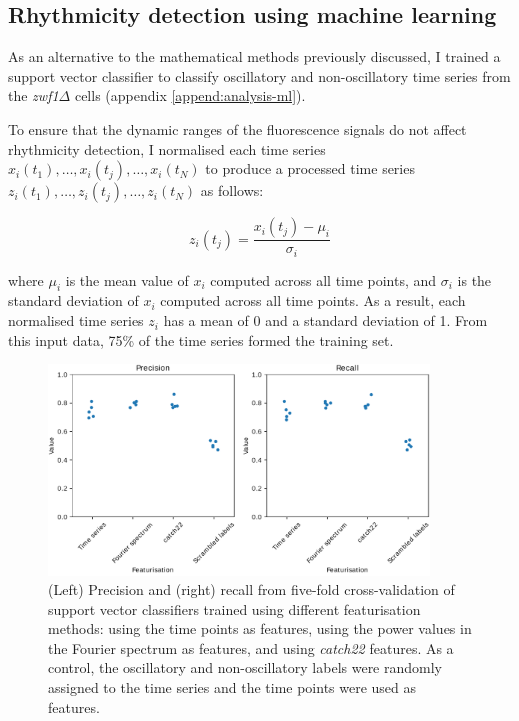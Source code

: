 \subsection{Rhythmicity detection using machine learning}
\label{subsec:analysis-classification-ml}

As an alternative to the mathematical methods previously discussed, I trained a support vector classifier to classify oscillatory and non-oscillatory time series from the \textit{zwf1$\Delta$} cells (appendix \ref{append:analysis-ml}).

To ensure that the dynamic ranges of the fluorescence signals do not affect rhythmicity detection, I normalised each time series $x_{i}(t_{1}), \ldots , x_{i}(t_{j}), \ldots , x_{i}(t_{N})$ to produce a processed time series $z_{i}(t_{1}), \ldots , z_{i}(t_{j}), \ldots , z_{i}(t_{N})$ as follows:

\begin{equation}
  z_{i}(t_{j}) = \frac{x_{i}(t_{j}) - \mu_{i}}{\sigma_{i}}
  \label{eq:analysis-stdscore}
\end{equation}

where $\mu_{i}$ is the mean value of $x_{i}$ computed across all time points, and $\sigma_{i}$ is the standard deviation of $x_{i}$ computed across all time points.
As a result, each normalised time series $z_{i}$ has a mean of 0 and a standard deviation of 1.
From this input data, 75\% of the time series formed the training set.

\begin{figure}
  \centering
  \includegraphics[width=0.9\textwidth]{svm_feat_compare_edit.pdf}
  \caption[
    Precision and recall from five-fold cross-validation of support vector classifiers trained using different featurisation methods.
  ]{
    (Left) Precision and (right) recall from five-fold cross-validation of support vector classifiers trained using different featurisation methods:
    using the time points as features,
    using the power values in the Fourier spectrum as features,
    and using \emph{catch22} features.
    As a control, the oscillatory and non-oscillatory labels were randomly assigned to the time series and the time points were used as features.
  }
  \label{fig:analysis-precision-recall}
\end{figure}


